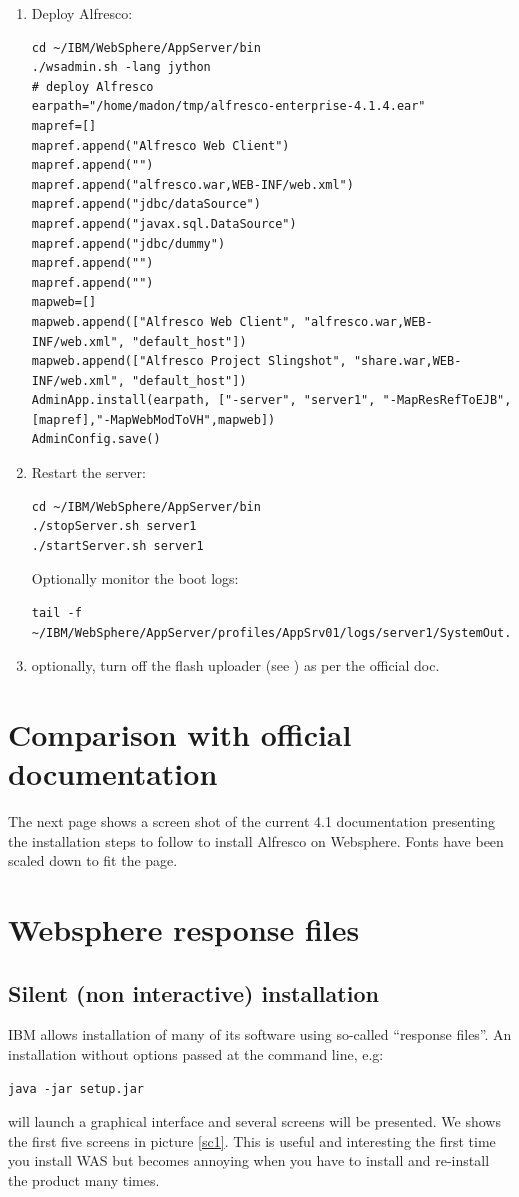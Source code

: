 \documentclass[10pt,a4]{article}
\begin{document}
\begin{enumerate}
\item Deploy Alfresco:
\begin{verbatim}
cd ~/IBM/WebSphere/AppServer/bin
./wsadmin.sh -lang jython 
# deploy Alfresco
earpath="/home/madon/tmp/alfresco-enterprise-4.1.4.ear"
mapref=[]
mapref.append("Alfresco Web Client")
mapref.append("")
mapref.append("alfresco.war,WEB-INF/web.xml")
mapref.append("jdbc/dataSource")
mapref.append("javax.sql.DataSource")
mapref.append("jdbc/dummy")
mapref.append("")
mapref.append("")
mapweb=[]
mapweb.append(["Alfresco Web Client", "alfresco.war,WEB-INF/web.xml", "default_host"])
mapweb.append(["Alfresco Project Slingshot", "share.war,WEB-INF/web.xml", "default_host"])
AdminApp.install(earpath, ["-server", "server1", "-MapResRefToEJB", [mapref],"-MapWebModToVH",mapweb])
AdminConfig.save()
\end{verbatim}

\item Restart the server:

\begin{verbatim}
cd ~/IBM/WebSphere/AppServer/bin
./stopServer.sh server1
./startServer.sh server1
\end{verbatim}
Optionally monitor the boot logs:
\begin{verbatim}
tail -f ~/IBM/WebSphere/AppServer/profiles/AppSrv01/logs/server1/SystemOut.log
\end{verbatim}
\item optionally, turn off the flash uploader (see \cite{MNT-9757}) as per the official doc.
\end{enumerate}

\section{Comparison with official documentation}
The next page shows a screen shot of the current 4.1 documentation presenting the installation steps to follow to install Alfresco on Websphere. Fonts have been scaled down to fit the page.


\section{Websphere response files}
\subsection{Silent (non interactive) installation}
IBM allows installation of many of its software using so-called ``response files''.
An installation without options passed at the command line, e.g:
\begin{verbatim}
java -jar setup.jar
\end{verbatim}
will launch a graphical interface and several screens will be presented. We shows the first five screens in picture \ref{sc1}.%
This is useful and interesting the first time you install WAS but becomes annoying when you have to install and re-install the product many times. 
\end{document}
